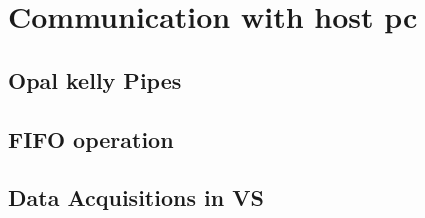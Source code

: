 \chapter{Communication with host pc}

\section{Opal kelly Pipes}
\section{FIFO operation}
\section{Data Acquisitions in VS}

